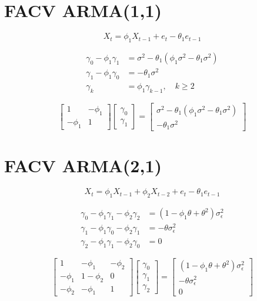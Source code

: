 \documentclass[12pt]{article} %
\begin{document}
\begin{multicols}{2}
\tiny %


\section*{FACV ARMA(1,1)}

\[
X_t = \phi_1 X_{t-1} + e_t - \theta_1 e_{t-1}
\]


\begin{align*}
\gamma_0 - \phi_1 \gamma_1  &= \sigma^2 - \theta_1 ( \phi_1 \sigma^2 - \theta_1 \sigma^2 )\\
\gamma_1 - \phi_1 \gamma_0 &= - \theta_1 \sigma^2 \\
\gamma_k &= \phi_1  \gamma_{k-1}, \quad k \geq 2
\end{align*}

\[
\begin{bmatrix}
1 & -\phi_1 \\
-\phi_1 & 1
\end{bmatrix}
\begin{bmatrix}
\gamma_0 \\
\gamma_1
\end{bmatrix}
=
\begin{bmatrix}
\sigma^2 - \theta_1 (\phi_1 \sigma^2 - \theta_1 \sigma^2) \\
-\theta_1 \sigma^2
\end{bmatrix}
\]



\section*{FACV ARMA(2,1)}

\[
X_t = \phi_1 X_{t-1} + \phi_2 X_{t-2} + e_t - \theta_1 e_{t-1}
\]


\begin{align*}
\gamma_0 - \phi_1 \gamma_1 - \phi_2 \gamma_2 &= (1 - \phi_1 \theta + \theta^2) \sigma^2_{\epsilon} \\
\gamma_1 - \phi_1 \gamma_0 - \phi_2 \gamma_1 &= -\theta \sigma^2_{\epsilon} \\
\gamma_2 - \phi_1 \gamma_1 - \phi_2 \gamma_0 &= 0
\end{align*}

\[
\begin{bmatrix}
1 & -\phi_1 & -\phi_2 \\
-\phi_1 & 1 - \phi_2 & 0 \\
-\phi_2 & -\phi_1 & 1
\end{bmatrix}
\begin{bmatrix}
\gamma_0 \\
\gamma_1 \\
\gamma_2
\end{bmatrix}
=
\begin{bmatrix}
(1 - \phi_1 \theta + \theta^2)\sigma^2_{\epsilon} \\
-\theta \sigma^2_{\epsilon} \\
0
\end{bmatrix}
\]




\end{multicols}
\end{document}
